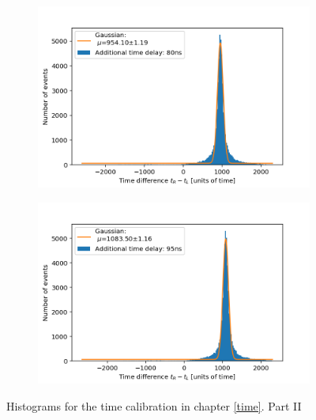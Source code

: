\documentclass[]{article}
\begin{document}
\begin{figure}[H]
\medskip
\begin{subfigure}{0.48\textwidth}
\includegraphics[width=\linewidth]{Plots/Time/80ns.png}
\end{subfigure}
\begin{subfigure}[c]{0.48\linewidth}
\includegraphics[width=\linewidth]{Plots/Time/95ns.png}
\end{subfigure}
\caption{Histograms for the time calibration in chapter \ref{time}. Part II }
\end{figure}
\end{document}
